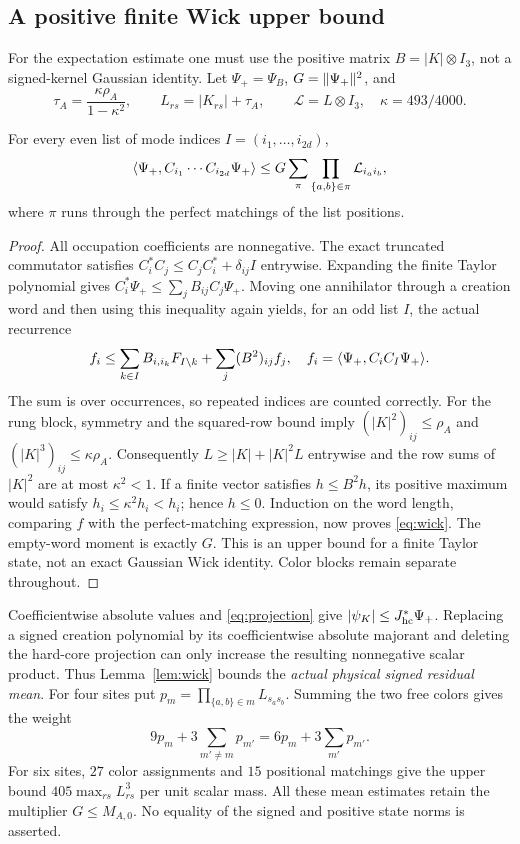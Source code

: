 \subsection{A positive finite Wick upper bound}
For the expectation estimate one must use the positive matrix
$B=|K|\otimes I_3$, not a signed-kernel Gaussian identity.
Let $\Psi_+=\Psi_B$, $G=\lVert \Psi_+\rVert^2$, and
\[
 \tau_A=\frac{\kappa\rho_A}{1-\kappa^2},\qquad
 L_{rs}=|K_{rs}|+\tau_A,\qquad \mathcal L=L\otimes I_3,
 \quad\kappa=493/4000.
\]
\begin{lemma}\label{lem:wick}
For every even list of mode indices $I=(i_1,\ldots,i_{2d})$,
\begin{equation}\label{eq:wick}
 \langle \Psi_+,C_{i_1}\cdots C_{i_{2d}}\Psi_+\rangle
 \le G\sum_{\pi}\prod_{\{a,b\}\in\pi}\mathcal L_{i_a i_b},
\end{equation}
where $\pi$ runs through the perfect matchings of the list positions.
\end{lemma}
\begin{proof}
All occupation coefficients are nonnegative. The exact truncated commutator
satisfies $C_i^*C_j\le C_jC_i^*+\delta_{ij}I$ entrywise. Expanding the finite
Taylor polynomial gives $C_i^*\Psi_+\le\sum_j B_{ij}C_j\Psi_+$.
Moving one annihilator through a creation word and then using this inequality
again yields, for an odd list $I$, the actual recurrence
\[
 f_i\le\sum_{k\in I}B_{i,i_k}F_{I\setminus k}+\sum_j(B^2)_{ij}f_j,
 \quad f_i=\langle \Psi_+,C_i C_I\Psi_+\rangle.
\]
The sum is over occurrences, so repeated indices are counted correctly.
For the rung block, symmetry and the squared-row bound imply
$(|K|^2)_{ij}\le\rho_A$ and $(|K|^3)_{ij}\le\kappa\rho_A$.
Consequently $L\ge|K|+|K|^2L$ entrywise and the row sums of $|K|^2$ are at most
$\kappa^2<1$. If a finite vector satisfies $h\le B^2h$, its positive maximum
would satisfy $h_i\le\kappa^2h_i<h_i$; hence $h\le0$.
Induction on the word length, comparing $f$ with the perfect-matching expression,
now proves \eqref{eq:wick}. The empty-word moment is exactly $G$.
This is an upper bound for a finite Taylor state, not an exact Gaussian Wick
identity. Color blocks remain separate throughout.
\end{proof}

Coefficientwise absolute values and \eqref{eq:projection} give
$|\psi_K|\le J_{\rm hc}^*\Psi_+$. Replacing a signed creation polynomial by
its coefficientwise absolute majorant and deleting the hard-core projection
can only increase the resulting nonnegative scalar product. Thus
Lemma~\ref{lem:wick} bounds the \emph{actual physical signed residual mean}.
For four sites put $p_m=\prod_{\{a,b\}\in m}L_{s_as_b}$.
Summing the two free colors gives the weight
\begin{equation}\label{eq:quarticweight}
 9p_m+3\sum_{m'\ne m}p_{m'}=6p_m+3\sum_{m'}p_{m'}.
\end{equation}
For six sites, $27$ color assignments and $15$ positional matchings give the
upper bound $405\max_{rs}L_{rs}^3$ per unit scalar mass.
All these mean estimates retain the multiplier $G\le M_{A,0}$. No equality of
the signed and positive state norms is asserted.
